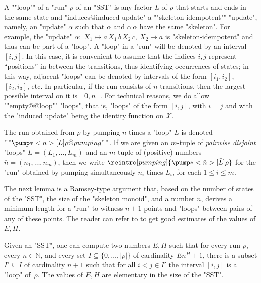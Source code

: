 \documentclass{theoretics}
\newcommand{\var}{\mathcal{X}}
\begin{document}
\AP
A ""loop"" of a "run" $\rho$ of an "SST" 
is any factor $L$ of $\rho$ 
that starts and ends in the same state and 
"induces@induced update" a ""skeleton-idempotent"" "update",
namely, an "update" $\alpha$ such that $\alpha$ and $\alpha\,\alpha$
have the same "skeleton". 
For example, the "update" 
$\alpha: \: X_1\mapsto a \, X_1 \, b \, X_2 \, c, \:  X_2\mapsto a$
is "skeleton-idempotent" and thus can be part of a "loop".
A "loop" in a "run" will be denoted by an interval $[i,j]$.
In this case, it is convenient to assume that the indices $i,j$ represent
``positions'' in-between the transitions, thus identifying occurrences of 
states; in this way, adjacent "loops" can be denoted by intervals of 
the form $[i_1,i_2]$, $[i_2,i_3]$, etc.
In particular, if the run consists of $n$ transitions, then 
the largest possible interval on it is $[0,n]$.
\AP
For technical reasons, we do allow ""empty@@loop"" "loops",
that is, "loops" of the form $[i,j]$, with $i=j$ and with 
the "induced update" being the identity function on $\var$.

\AP
The run obtained from $\rho$ by pumping $n$ times a "loop" $L$ 
is denoted $""\pump*<n>[L]{\rho} @pumping""$.
If we are given an $m$-tuple of \emph{pairwise disjoint} "loops"
$\bar{L}=(L_1,\dots,L_m)$ and an $m$-tuple of (positive) numbers 
$\bar{n}=(n_1,\dots,n_m)$, then we write
$\reintro[pumping]{\pump*<\bar n>[\bar L]{\rho}}$ 
for the "run" obtained by pumping simultaneously $n_i$ times
$L_i$, for each $1 \le i \le m$. 


The next lemma is a Ramsey-type argument that,
based on the number of states of the "SST", the size of the 
"skeleton monoid", and a number $n$,
derives a minimum length for a "run" to witness $n+1$ points
and "loops" between pairs of any of these points. 
The reader can refer to \cite{JeckerSTACS21}
to get good estimates of the values of $E,H$.


\begin{lemma}\label{lem:ramsey}
Given an "SST", one can compute two numbers $E,H$ such that
for every run $\rho$, every $n\in\mathbb{N}$, and every set
$I \subseteq \{0,\dots,|\rho|\}$ of cardinality $E n^H+1$, 
there is a subset $I'\subseteq I$ of cardinality $n + 1$
such that for all $i < j \in I'$ the interval
$[i,j]$ is a "loop" of~$\rho$.
The values of $E,H$ are elementary in the size of the "SST".
\end{lemma}
\end{document}
